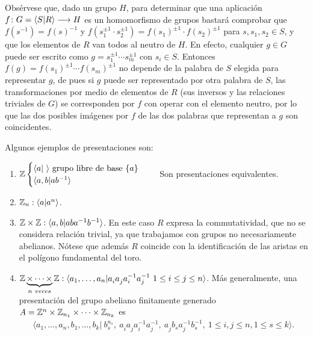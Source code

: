 \documentclass[GTSResumen.tex]{subfiles}
\begin{document}
\begin{nota}[Importante] Obsérvese que, dado un grupo $H$, para determinar que una aplicación $f\colon{G=\langle S|R\rangle}\longrightarrow{H}$ es un homomorfismo de grupos bastará comprobar que $f(s^{-1})=f(s)^{-1}$ y $f(s_1^{\pm 1}\cdot s_2^{\pm 1})=f(s_1)^{\pm 1}\cdot f(s_2)^{\pm 1}$ para $s,s_1,s_2\in S$, y que los elementos de $R$ van todos al neutro de $H$. En efecto, cualquier $g\in G$ puede ser escrito como $g=s_1^{\pm 1}\cdots s_m^{\pm 1}$ con $s_i\in S$. Entonces $f(g)=f(s_1)^{\pm 1}\cdots f(s_m)^{\pm 1}$ no depende de la palabra de $S$ elegida para representar $g$, de pues si $g$ puede ser representado por otra palabra de $S$, las transformaciones por medio de elementos de $R$ (sus inversos y las relaciones triviales de $G$) se corresponden por $f$ con operar con el elemento neutro, por lo que las dos posibles imágenes por $f$ de las dos palabras que representan a $g$ son coincidentes.
\end{nota}

\begin{ej} Algunos ejemplos de presentaciones son:
\begin{enumerate}
\item $\mathbb{Z}\begin{cases}
\langle a|\ \rangle  \text{ grupo libre de base }\{a\}\\
\langle a,b|ab^{-1}\rangle
\end{cases}\quad$ Son presentaciones equivalentes.
\item $\mathbb{Z}_n: \langle a| a^n\rangle$.
\item $\mathbb{Z}\times\mathbb{Z}: \langle a,b| aba^{-1}b^{-1}\rangle$. En este caso $R$ expresa la commutatividad, que no se considera relación trivial, ya que trabajamos con grupos no necesariamente abelianos. Nótese que además $R$ coincide con la identificación de las aristas en el polígono fundamental del toro.
\item $\Z\underbrace{\times\cdots\times}_{n\ veces}\Z: \langle a_1,\dots,a_n|a^{}_i a^{}_j a^{-1}_i a^{-1}_j\ 1\leq i\leq j\leq n\rangle$. Más generalmente, una presentación del grupo abeliano finitamente generado  $A=\mathbb{Z}^n\times\mathbb{Z}_{n_1}\times\cdots\times\mathbb{Z}_{n_k}$ es 
\begin{gather*}
\langle a_1,\dots,a_n,b_1,\dots,b_k|\ b^{n_s}_s,\ a^{}_ia^{}_ja^{-1}_ia^{-1}_j,\ a^{}_j b^{}_s a^{-1}_j b^{-1}_s,\ 1\leq i,j\leq n, 1\leq s\leq k\rangle.
\end{gather*}
\end{enumerate}
\end{ej}
\end{document}
